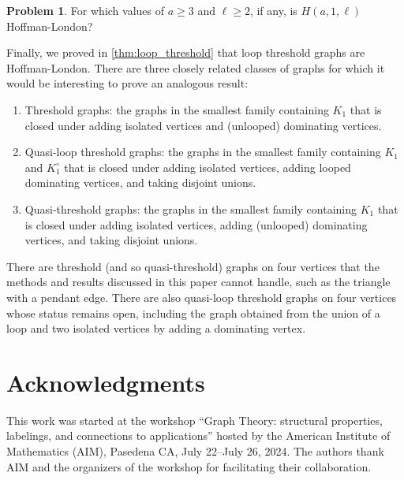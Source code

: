 \documentclass[11pt]{article}
\theoremstyle{definition}
\newtheorem{problem}[theorem]{Problem}
\renewcommand{\loop}{\circ}
\begin{document}
\begin{problem}
    For which values of $a \ge 3$ and $\ell \ge 2$, if any, is $H(a,1,\ell)$ Hoffman-London?
\end{problem}

Finally, we proved in \cref{thm:loop_threshold} that loop threshold graphs are Hoffman-London. There are three closely related classes of graphs for which it would be interesting to prove an analogous result:
\begin{enumerate}
\item Threshold graphs: the graphs in the smallest family containing $K_1$ that is closed under adding isolated vertices and (unlooped) dominating vertices.
\item Quasi-loop threshold graphs: the graphs in the smallest family containing $K_1$ and $K_1^\loop$ that is closed under adding isolated vertices, adding looped dominating vertices, and taking disjoint unions.
\item Quasi-threshold graphs: the graphs in the smallest family containing $K_1$ that is closed under adding isolated vertices, adding (unlooped) dominating vertices, and taking disjoint unions.
\end{enumerate}
There are threshold (and so quasi-threshold) graphs on four vertices that the methods and results discussed in this paper cannot handle, such as the triangle with a pendant edge. There are also quasi-loop threshold graphs on four vertices whose status remains open, including the graph obtained from the union of a loop and two isolated vertices by adding a dominating vertex.

\section*{Acknowledgments}

This work was started at the workshop ``Graph Theory: structural properties, labelings, and connections to applications'' hosted by the American Institute of Mathematics (AIM), Pasedena CA, July 22--July 26, 2024. The authors thank AIM and the organizers of the workshop for facilitating their collaboration.
\end{document}
